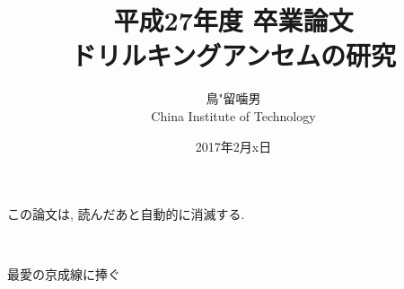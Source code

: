 \documentclass[a4paper,11pt]{jsbook}
\begin{document}
\title{平成27年度 卒業論文\\
ドリルキングアンセムの研究}

\author{鳥"留噛男 \\
China Institute of Technology}

\date{2017年2月x日}

\maketitle

この論文は, 読んだあと自動的に消滅する. 
\clearpage

\thispagestyle{empty}
\vfil
\ \\
\vspace{15em}
\begin{center}
	{\Large 最愛の京成線に捧ぐ }
\end{center}



\tableofcontents



\cleardoublepage
{}






\appendix





\newpage
\printindex
\end{document}
